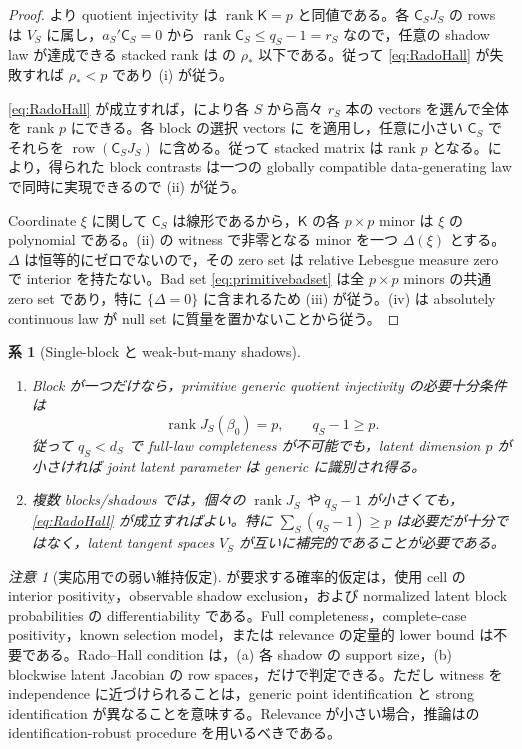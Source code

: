 \documentclass[11pt,a4paper]{ltjsarticle}
\newtheorem{corollary}{系}[section]
\theoremstyle{remark}
\newtheorem{remark}{注意}[section]
\newcommand{\rank}{\operatorname{rank}}
\newcommand{\row}{\operatorname{row}}
\begin{document}
\begin{proof}
より quotient injectivity は $\rank\mathsf K=p$ と同値である。各 $\mathsf C_SJ_S$ の rows は $V_S$ に属し，$a_S'\mathsf C_S=0$ から $\rank\mathsf C_S\le q_S-1=r_S$ なので，任意の shadow law が達成できる stacked rank は  の $\rho_*$ 以下である。従って \eqref{eq:RadoHall} が失敗すれば $\rho_*<p$ であり (i) が従う。

\eqref{eq:RadoHall} が成立すれば，により各 $S$ から高々 $r_S$ 本の vectors を選んで全体を rank $p$ にできる。各 block の選択 vectors に を適用し，任意に小さい $\mathsf C_S$ でそれらを $\row(\mathsf C_SJ_S)$ に含める。従って stacked matrix は rank $p$ となる。により，得られた block contrasts は一つの globally compatible data-generating law で同時に実現できるので (ii) が従う。

Coordinate $\xi$ に関して $\mathsf C_S$ は線形であるから，$\mathsf K$ の各 $p\times p$ minor は $\xi$ の polynomial である。(ii) の witness で非零となる minor を一つ $\Delta(\xi)$ とする。$\Delta$ は恒等的にゼロでないので，その zero set は relative Lebesgue measure zero で interior を持たない。Bad set \eqref{eq:primitivebadset} は全 $p\times p$ minors の共通 zero set であり，特に $\{\Delta=0\}$ に含まれるため (iii) が従う。(iv) は absolutely continuous law が null set に質量を置かないことから従う。
\end{proof}

\begin{corollary}[Single-block と weak-but-many shadows]\label{cor:primitivegenericcases}
\begin{enumerate}[label=(\roman*)]
\item Block が一つだけなら，primitive generic quotient injectivity の必要十分条件は
\[
\rank J_S(\beta_0)=p,
\qquad
q_S-1\ge p.
\]
従って $q_S<d_S$ で full-law completeness が不可能でも，latent dimension $p$ が小さければ joint latent parameter は generic に識別され得る。
\item 複数 blocks/shadows では，個々の $\rank J_S$ や $q_S-1$ が小さくても，\eqref{eq:RadoHall} が成立すればよい。特に $\sum_S(q_S-1)\ge p$ は必要だが十分ではなく，latent tangent spaces $V_S$ が互いに補完的であることが必要である。
\end{enumerate}
\end{corollary}

\begin{remark}[実応用での弱い維持仮定]\label{rem:primitivepractical}
が要求する確率的仮定は，使用 cell の interior positivity，observable shadow exclusion，および normalized latent block probabilities の differentiability である。Full completeness，complete-case positivity，known selection model，または relevance の定量的 lower bound は不要である。Rado--Hall condition は，(a) 各 shadow の support size，(b) blockwise latent Jacobian の row spaces，だけで判定できる。ただし witness を independence に近づけられることは，generic point identification と strong identification が異なることを意味する。Relevance が小さい場合，推論はの identification-robust procedure を用いるべきである。
\end{remark}
\end{document}
